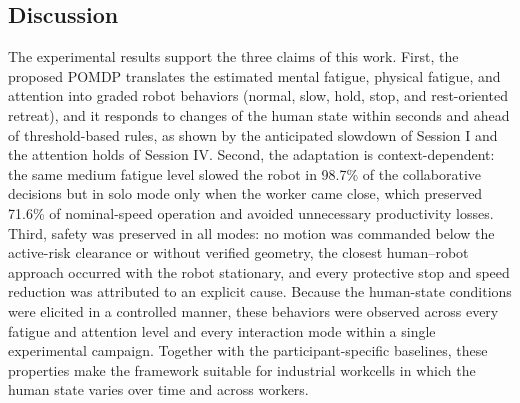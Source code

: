 \subsection{Discussion}
\label{sec:discussion}

The experimental results support the three claims of this work. First, the proposed POMDP translates the
estimated mental fatigue, physical fatigue, and attention into graded robot behaviors (normal, slow, hold,
stop, and rest-oriented retreat), and it responds to changes of the human state within seconds and ahead of
threshold-based rules, as shown by the anticipated slowdown of Session I and the attention holds of Session
IV. Second, the adaptation is context-dependent: the same medium fatigue level slowed the robot in 98.7\% of
the collaborative decisions but in solo mode only when the worker came close, which preserved 71.6\% of
nominal-speed operation and avoided unnecessary productivity losses. Third, safety was preserved in all
modes: no motion was commanded below the active-risk clearance or without verified geometry, the closest
human--robot approach occurred with the robot stationary, and every protective stop and speed reduction was
attributed to an explicit cause. Because the human-state conditions were elicited in a controlled manner, these
behaviors were observed across every fatigue and attention level and every interaction mode within a single
experimental campaign. Together with the participant-specific baselines, these properties make the
framework suitable for industrial workcells in which the human state varies over time and across workers.
